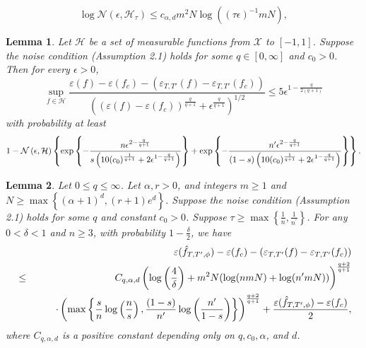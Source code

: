 \documentclass[10pt,a4paper]{amsart}
\newtheorem{lemma}{Lemma}
\begin{document}
    \begin{equation}\label{coveringeqn}
        \log \mathcal{N}(\epsilon,\mathcal{H}_\tau) \leq c_{\alpha, d} m^2  N \log ((\tau\epsilon)^{-1}mN),
    \end{equation}

\begin{lemma}\label{uniformBernstein}
Let ${\mathcal H}$ be a set of measurable functions from ${\mathcal X}$ to $[-1, 1]$. Suppose the noise condition (Assumption 2.1) holds for some $q\in [0, \infty]$ and $c_0 >0$. Then for every
$\epsilon>0$, 
$$\sup_{f\in {\mathcal H}} \frac{\varepsilon (f) - \varepsilon (f_c) - \left(\varepsilon_{T, T'} (f) - \varepsilon_{T, T'} (f_c)\right)}{\left(\left(\varepsilon (f) - \varepsilon (f_c)\right)^{\frac{q}{q+1}} + \epsilon^{\frac{q}{q+1}}\right)^{1/2}} \leq 5 \epsilon^{1-{\frac{q}{2(q+1)}}}
$$
with probability at least 
\begin{eqnarray*}
1-  {\mathcal N}\left(\epsilon, {\mathcal H}\right) 
\left\{\exp \left\{-
{n \epsilon^{2-{\frac{q}{q+1}}} \over s\left(10 (c_0)^{\frac{1}{q+1}} +2 \epsilon^{1-{\frac{q}{q+1}}}\right)}\right\}
 +\exp \left\{-
{n' \epsilon^{2-{\frac{q}{q+1}}} \over (1-s) \left(10 (c_0)^{\frac{1}{q+1}} +2 \epsilon^{1-{\frac{q}{q+1}}}\right)}\right\}\right\}. 
\end{eqnarray*}
\end{lemma}

\begin{lemma}\label{lemma:estimationII}
     Let $0\leq q \leq \infty$. Let $\alpha,r >0$, and integers $m \geq 1$ and \\$N \geq \max \left\{(\alpha +1)^d, (r+1)e^d\right\}$.
    Suppose the noise condition (Assumption 2.1) holds for some $q$ and constant $c_0>0$. Suppose $\tau \geq \max\left\{\frac{1}{n}, \frac{1}{n^\prime}\right\}$. 
    For any $0 <\delta < 1$ and $n\geq 3$, with probability $1-\frac{\delta}{2}$, we have 
\begin{eqnarray*}
  &&   \varepsilon (\Hat{f}_{T, T^\prime,\phi}) - \varepsilon (f_c) - \left(\varepsilon_{T, T'} (f) - \varepsilon_{T, T'} (f_c)\right)\\
 &\leq&  C_{q,\alpha, d} \left(\log \left(\frac{4}{\delta}\right) + m^2 N (\log(nmN)+\log(n^\prime mN))\right)^{\frac{q+2}{q+1}} \\
 &&\quad\quad\cdot\left(  \max\left\{  \frac{s}{n}
\log \left(\frac{n}{s}\right), \frac{(1-s)}{n^\prime}\log \left(\frac{n^\prime}{1-s}\right) \right\} \right)^{\frac{q+2}{q+1}} 
+ \frac{\varepsilon (\Hat{f}_{T, T^\prime,\phi}) - \varepsilon (f_c)}{2},
\end{eqnarray*}
where $C_{q,\alpha, d}$ is a positive constant depending only on $q,c_0, \alpha$, and $d$. 
\end{lemma}
\end{document}
